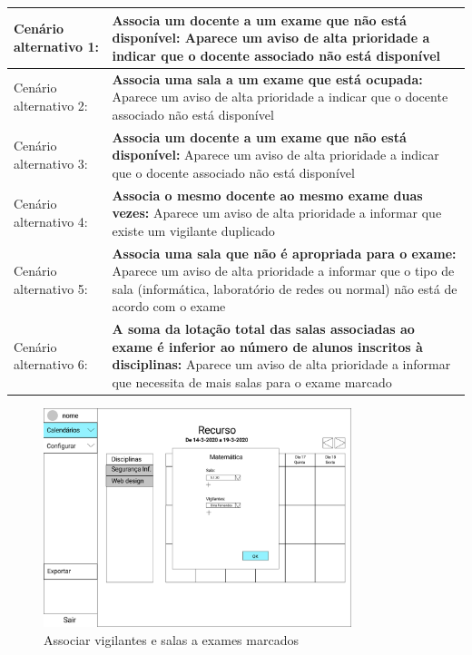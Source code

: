 \documentclass[11pt, twoside]{report}
\begin{document}
\begin{center}
\begin{longtable}{|m{4cm}|m{12cm}|}
			\hline
			Cenário alternativo 1:     & \textbf{Associa um docente a um exame que não está disponível:} Aparece um aviso de alta prioridade a indicar que o docente associado não está disponível                                                                    \\
			\hline
			Cenário alternativo 2:     & \textbf{Associa uma sala a um exame que está ocupada:} Aparece um aviso de alta prioridade a indicar que o docente associado não está disponível                                                                               \\
			\hline
			Cenário alternativo 3:     & \textbf{Associa um docente a um exame que não está disponível:} Aparece um aviso de alta prioridade a indicar que o docente associado não está disponível                                                                    \\
			\hline
			Cenário alternativo 4:     & \textbf{Associa o mesmo docente ao mesmo exame duas vezes:} Aparece um aviso de alta prioridade a informar que existe um vigilante duplicado                                                                                       \\
			\hline
			Cenário alternativo 5:     & \textbf{Associa uma sala que não é apropriada para o exame:} Aparece um aviso de alta prioridade a informar que o tipo de sala (informática, laboratório de redes ou normal) não está de acordo com o exame                  \\
			\hline
			Cenário alternativo 6:     & \textbf{A soma da lotação total das salas associadas ao exame é inferior ao número de alunos inscritos à disciplinas:} Aparece um aviso de alta prioridade a informar que necessita de mais salas para o exame marcado        \\
			\hline
		\end{longtable}
	\end{center}
	
	
	\begin{figure}[H] 
		\centering 
		\includegraphics[width=0.8\textwidth,height=0.8\textheight,keepaspectratio]{image/prototipowireframes/popup}
		\caption{Associar vigilantes e salas a exames marcados}
		\label{interfacevigilantes}
	\end{figure}
	
\end{document}
